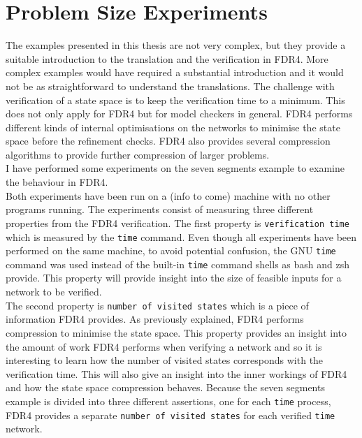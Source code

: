 \section{Problem Size Experiments}
The examples presented in this thesis are not very complex, but they provide a suitable introduction to the translation and the verification in FDR4. More complex examples would have required a substantial introduction and it would not be as straightforward to understand the translations. The challenge with verification of a state space is to keep the verification time to a minimum. This does not only apply for FDR4 but for model checkers in general. FDR4 performs different kinds of internal optimisations on the networks to minimise the state space before the refinement checks. FDR4 also provides several compression algorithms to provide further compression of larger problems. \\

I have performed some experiments on the seven segments example to examine the behaviour in FDR4.\\
Both experiments have been run on a (info to come) machine with no other programs running. The experiments consist of measuring three different properties from the FDR4 verification. The first property is \texttt{verification time} which is measured by the \texttt{time} command. Even though all experiments have been performed on the same machine, to avoid potential confusion, the GNU \texttt{time} command was used instead of the built-in \texttt{time} command shells as bash and zsh provide. This property will provide insight into the size of feasible inputs for a \cspm{} network to be verified.\\

The second property is \texttt{number of visited states} which is a piece of information FDR4 provides.
As previously explained, FDR4 performs compression to minimise the state space.
This property provides an insight into the amount of work FDR4 performs when verifying a network and so it is interesting to learn how the number of visited states corresponds with the verification time. This will also give an insight into the inner workings of FDR4 and how the state space compression behaves.
Because the seven segments example is divided into three different assertions, one for each \texttt{time} process, FDR4 provides a separate \texttt{number of visited states} for each verified \texttt{time} network. \\

